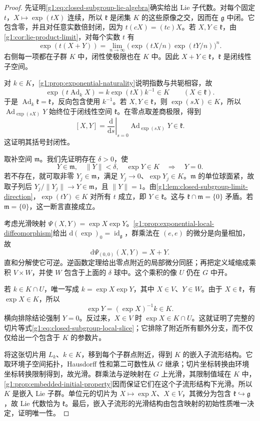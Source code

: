 \begin{proof}
	先证明\eqref{g1:eq:closed-subgroup-lie-algebra}确实给出 Lie 子代数。对每个固定 \(t\)，\(X\mapsto\exp(tX)\) 连续，所以 \(\mathfrak k\) 是闭集 \(K\) 的这些原像之交，因而在 \(\mathfrak g\) 中闭。它包含零，并且对任意实数倍封闭，因为 \(t(cX)=(tc)X\)。若 \(X,Y\in\mathfrak k\)，由\cref{g1:cor:lie-product-limit}，对每个实数 \(t\) 有
	\[
		\exp(t(X+Y))
		=\lim_{n\to\infty}\bigl(\exp(tX/n)\exp(tY/n)\bigr)^n.
	\]
	右侧每一项都在子群 \(K\) 中，闭性使极限也在 \(K\) 中。因此 \(X+Y\in\mathfrak k\)，\(\mathfrak k\) 是闭线性子空间。

	对 \(k\in K\)，\cref{g1:prop:exponential-naturality}说明指数与共轭相容，故
	\[
		\exp(t\operatorname{Ad}_kX)=k\exp(tX)k^{-1}\in K
		\qquad(X\in\mathfrak k).
	\]
	于是 \(\operatorname{Ad}_k\mathfrak k=\mathfrak k\)，反向包含使用 \(k^{-1}\)。若 \(X,Y\in\mathfrak k\)，则 \(\exp(sX)\in K\)，所以 \(\operatorname{Ad}_{\exp(sX)}Y\) 始终位于闭线性空间 \(\mathfrak k\)。在零点取差商极限，得到
	\[
		[X,Y]=\left.\frac{\mathrm{d}}{\mathrm{d}s}\right|_{s=0}
		\operatorname{Ad}_{\exp(sX)}Y\in\mathfrak k.
	\]
	这证明其括号封闭性。

	取补空间 \(\mathfrak m\)。我们先证明存在 \(\delta>0\)，使
	\[
		Y\in\mathfrak m,\quad \lVert Y\rVert<\delta,\quad \exp Y\in K
		\quad\Longrightarrow\quad Y=0.
	\]
	若不存在，就可取非零 \(Y_j\in\mathfrak m\)，满足 \(Y_j\to0\)、\(\exp Y_j\in K\)。\(\mathfrak m\) 的单位球面紧，故取子列后 \(Y_j/\lVert Y_j\rVert\to Y\in\mathfrak m\)，且 \(\lVert Y\rVert=1\)。由\cref{g1:lem:closed-subgroup-limit-direction}，\(\exp(tY)\in K\) 对所有 \(t\) 成立，即 \(Y\in\mathfrak k\)。这与 \(\mathfrak k\cap\mathfrak m=\{0\}\) 矛盾。若 \(\mathfrak m=\{0\}\)，这一断言直接成立。

	考虑光滑映射 \(\Psi(X,Y)=\exp X\exp Y\)。\cref{g1:prop:exponential-local-diffeomorphism}给出 \(\mathrm{d}(\exp)_0=\operatorname{id}_{\mathfrak g}\)，群乘法在 \((e,e)\) 的微分是向量相加，故
	\[
		\mathrm{d}\Psi_{(0,0)}(X,Y)=X+Y.
	\]
	直和分解使它可逆。逆函数定理给出零点附近的局部微分同胚；再把定义域缩成乘积 \(V\times W\)，并使 \(W\) 包含于上面的 \(\delta\) 球中。这个乘积的像 \(U\) 仍在 \(G\) 中开。

	若 \(k\in K\cap U\)，唯一写成 \(k=\exp X\exp Y\)，其中 \(X\in V\)、\(Y\in W\)。由于 \(X\in\mathfrak k\)，有 \(\exp X\in K\)，所以
	\[
		\exp Y=(\exp X)^{-1}k\in K.
	\]
	横向排除结论强制 \(Y=0\)。反过来，\(X\in V\) 时 \(\exp X\in K\cap U\)。这就证明了完整的切片等式\eqref{g1:eq:closed-subgroup-local-slice}；它排除了附近所有额外分支，而不仅仅给出一个包含于 \(K\) 的参数片。

	将这张切片用 \(L_k\)、\(k\in K\)，移到每个子群点附近，得到 \(K\) 的嵌入子流形结构。它取环境子空间拓扑，Hausdorff 性和第二可数性从 \(G\) 继承；切片坐标转换由环境坐标转换限制得到，故光滑。群乘法与逆映射在 \(G\) 上光滑，其限制值域在 \(K\) 中，\cref{g1:prop:embedded-initial-property}因而保证它们在这个子流形结构下光滑。所以 \(K\) 是嵌入 Lie 子群。单位元的切片为 \(X\mapsto\exp X\)、\(X\in V\)，其微分为包含 \(\mathfrak k\hookrightarrow\mathfrak g\)，故 Lie 代数恰为 \(\mathfrak k\)。最后，嵌入子流形的光滑结构由包含映射的初始性质唯一决定，证明唯一性。
\end{proof}

